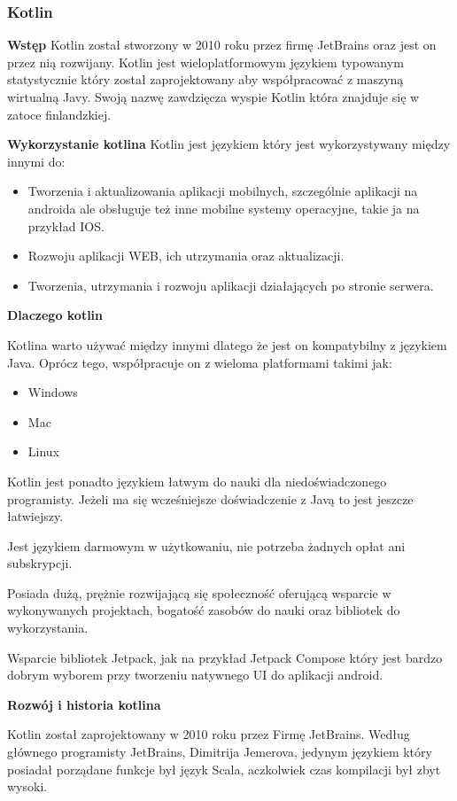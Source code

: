 \subsubsection{Kotlin}

\textbf{Wstęp}
Kotlin został stworzony w 2010 roku przez firmę JetBrains oraz jest on przez nią rozwijany. Kotlin jest wieloplatformowym językiem typowanym statystycznie który został zaprojektowany aby współpracować z maszyną wirtualną Javy. Swoją nazwę zawdzięcza wyspie Kotlin która znajduje się w zatoce finlandzkiej.

\textbf{Wykorzystanie kotlina}
Kotlin jest językiem który jest wykorzystywany między innymi do:
\begin{itemize}
	\item Tworzenia i aktualizowania aplikacji mobilnych, szczególnie aplikacji na androida ale obsługuje też inne mobilne systemy operacyjne, takie ja na przykład IOS.
	\item Rozwoju aplikacji WEB, ich utrzymania oraz aktualizacji.
	\item Tworzenia, utrzymania i rozwoju aplikacji działających po stronie serwera.
\end{itemize}

\textbf{Dlaczego kotlin}

Kotlina warto używać między innymi dlatego że jest on kompatybilny z językiem Java. Oprócz tego, współpracuje on z wieloma platformami takimi jak:
\begin{itemize}
	\item Windows
	\item Mac
	\item Linux
\end{itemize}
Kotlin jest ponadto językiem łatwym do nauki dla niedoświadczonego programisty. Jeżeli ma się wcześniejsze doświadczenie z Javą to jest jeszcze łatwiejszy.

Jest językiem darmowym w użytkowaniu, nie potrzeba żadnych opłat ani subskrypcji.

Posiada dużą, prężnie rozwijającą się społeczność oferującą wsparcie w wykonywanych projektach, bogatość zasobów do nauki oraz bibliotek do wykorzystania.

Wsparcie bibliotek Jetpack, jak na przykład Jetpack Compose który jest bardzo dobrym wyborem przy tworzeniu natywnego UI do aplikacji android.

\textbf{Rozwój i historia kotlina}

Kotlin został zaprojektowany w 2010 roku przez Firmę JetBrains. Według głównego programisty JetBrains, Dimitrija Jemerova, jedynym językiem który posiadał porządane funkcje był język Scala, aczkolwiek czas kompilacji był zbyt wysoki.

